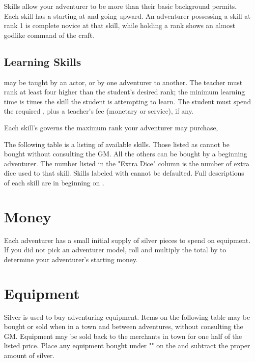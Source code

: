 \begin{multicols*}{2}
Skills allow your adventurer to be more than their basic background permits. Each skill has a  starting at  and going upward. An adventurer possessing a skill at rank 1 is complete novice at that skill, while holding a rank  shows an almost godlike command of the craft.

\subsection{Learning Skills}
 may be taught by an actor, or by one adventurer to another. The teacher must rank at least four higher than the student's desired rank; the minimum learning time is  times the skill  the student is attempting to learn. The student must spend the required \EP, plus a teacher's fee (monetary or service), if any.

Each skill's  governs the maximum rank your adventurer may purchase, 

The following table is a listing of available skills. Those listed as  cannot be bought without consulting the GM. All the others can be bought by a beginning adventurer. The number listed in the "Extra Dice" column is the number of extra dice used to  that skill. Skills labeled with  cannot be defaulted. Full descriptions of each skill are in  beginning on .
\vfill\null
\label{create-skills}
\begin{tcbraster}[raster columns=1,boxrule=0pt,title=\textbf{Skills},left=0pt,right=0pt,top=0pt,bottom=0pt,boxsep=0pt,boxrule=0.6pt,lefttitle=2.5mm,toptitle=1mm,bottomtitle=1mm,colbacktitle=Navy,colback=white]
\end{tcbraster}
\section{Money}
Each adventurer has a small initial supply of silver pieces to spend on equipment. If you did not pick an adventurer model, roll  and multiply the total by  to determine your adventurer's starting money.
\section{Equipment}
Silver is used to buy adventuring equipment. Items on the following table may be bought or sold when in a town and between adventures, without consulting the GM. Equipment may be sold back to the merchants in town for one half of the listed price. Place any equipment bought under "" on the  and subtract the proper amount of silver.


\end{multicols*}
